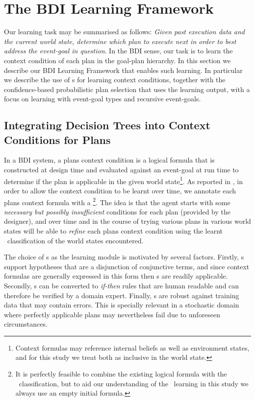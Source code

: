 \section{The BDI Learning Framework}\label{sec:framework}

Our learning task may be summarised as follows: \textit{Given past execution data and the current world state, determine which plan to execute next in order to best address the event-goal in question}. In the BDI sense, our task is to learn the context condition of each plan in the goal-plan hierarchy. In this section we describe our BDI Learning Framework that enables such learning. In particular we describe the use of \dt s for learning context conditions, together with the confidence-based probabilistic plan selection that uses the learning output, with a focus on learning with event-goal types and recursive event-goals.

\subsection{Integrating Decision Trees into Context Conditions for Plans}\label{sec:introlearning}

In a BDI system, a plans context condition is a logical formula that is constructed at design time and evaluated against an event-goal at run time to determine if the plan is applicable in the given world state\footnote{Context formulas may reference internal beliefs as well as environment states, and for this study we treat both as inclusive in the world state.}. As reported in \cite{Airiau:IJAT:09}, in order to allow the context condition to be learnt over time, we annotate each plans context formula with a \textit{\dt}\footnote{It is perfectly feasible to combine the existing logical formula with the \dt\ classification, but to aid our understanding of the \dt\ learning in this study we always use an empty initial formula.}. The idea is that the agent starts with some \textit{necessary but possibly insufficient} conditions for each plan (provided by the designer), and over time and in the course of trying various plans in various world states will be able to \textit{refine} each plans context condition using the learnt \dt\ classification of the world states encountered.

The choice of \dt s as the learning module is motivated by several factors. Firstly, \dt s support hypotheses that are a disjunction of conjunctive terms, and since context formulas are generally expressed in this form then \dt s are readily applicable. Secondly, \dt s can be converted to \textit{if-then} rules that are human readable and can therefore be verified by a domain expert. Finally, \dt s are robust against training data that may contain errors. This is specially relevant in a stochastic domain where perfectly applicable plans may nevertheless fail due to unforeseen circumstances.

